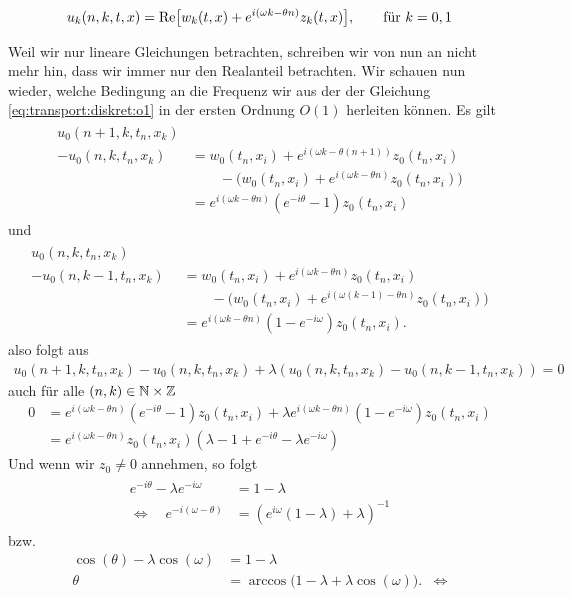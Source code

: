 \begin{align}
u_k(n, k, t, x) = \operatorname{Re} \bigl[ w_k(t, x) + e^{i (\omega k - \theta n)} z_k(t, x) \bigr], \qquad \text{für $k = 0,1$}
\end{align}

Weil wir nur lineare Gleichungen betrachten, schreiben wir von nun an nicht mehr hin, dass wir immer nur den Realanteil betrachten.
Wir schauen nun wieder, welche Bedingung an die Frequenz wir aus der der Gleichung \eqref{eq:transport:diskret:o1} in der ersten Ordnung $O(1)$ herleiten können.
Es gilt
\begin{align}\begin{split}
u_0(n+1,k,t_n,x_k)&\qquad\quad\\
- u_0(n,k,t_n,x_k) &= w_0(t_n,x_i) + e^{i (\omega k - \theta (n+1))} z_0(t_n,x_i)\\
    &\qquad - \bigl( w_0(t_n,x_i) + e^{i (\omega k - \theta n)} z_0(t_n,x_i) \bigr)\\
&= e^{i (\omega k - \theta n)} (e^{-i\theta} - 1) z_0(t_n,x_i)
\end{split}\end{align}
und
\begin{align}\begin{split}
u_0(n,k,t_n,x_k)\qquad \quad &\\
- u_0(n,k-1,t_n,x_k) &= w_0(t_n,x_i) + e^{i (\omega k - \theta n)} z_0(t_n,x_i)\\
& \qquad - \bigl( w_0(t_n,x_i) + e^{i (\omega (k-1) - \theta n)} z_0(t_n,x_i) \bigr)\\
&= e^{i (\omega k - \theta n)} (1 - e^{-i \omega}) z_0(t_n,x_i).
\end{split}\end{align}
also folgt aus
\begin{align}\label{eq:wkb:bed1}
u_0(n+1,k,t_n,x_k) - u_0(n,k,t_n,x_k) + \lambda (u_0(n,k,t_n,x_k) - u_0(n,k-1,t_n,x_k)) = 0
\end{align}
auch für alle $(n, k) \in \mathbb N \times \mathbb Z$
\begin{align}
0 &= e^{i (\omega k - \theta n)} (e^{-i\theta} - 1) z_0(t_n,x_i) + \lambda e^{i (\omega k - \theta n)} (1 - e^{-i \omega}) z_0(t_n,x_i)\\
&= e^{i (\omega k - \theta n)} z_0(t_n,x_i) ( \lambda - 1 + e^{-i\theta} - \lambda e^{-i \omega} )
\end{align}
Und wenn wir $z_0 \neq 0$ annehmen, so folgt
\begin{align}\label{eq:wkb:gl1}
\begin{split}
e^{-i \theta} - \lambda e^{-i \omega} &= 1 - \lambda\\
\Leftrightarrow \quad e^{-i (\omega - \theta)} &= \left( e^{i \omega} (1 -  \lambda) + \lambda \right)^{-1}
\end{split}
\end{align}
bzw.
\begin{align*}
\cos(\theta) - \lambda \cos(\omega) &= 1 - \lambda\\
\theta  &=  \arccos\bigl(1 - \lambda + \lambda \cos(\omega) \bigr). &\Leftrightarrow
\end{align*}

